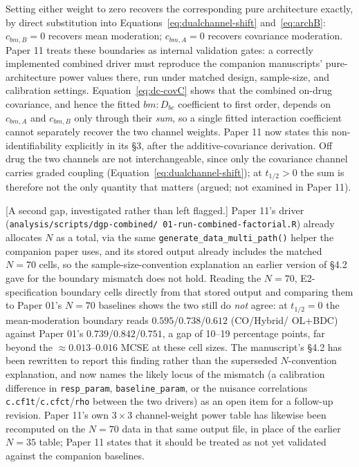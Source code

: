 \documentclass[11pt]{article}
\newcommand{\note}[1]{\textcolor{blue!60!black}{\small [#1]}}
\newcommand{\code}[1]{\texttt{#1}}
\begin{document}
Setting either weight to zero recovers the corresponding pure
architecture exactly, by direct substitution into
Equations~\eqref{eq:dualchannel-shift} and~\eqref{eq:archB}:
$c_{bm,B}=0$ recovers mean moderation; $c_{bm,A}=0$ recovers
covariance moderation. Paper 11 treats these boundaries as internal
validation gates: a correctly implemented combined driver must
reproduce the companion manuscripts' pure-architecture power values
there, run under matched design, sample-size, and calibration
settings. Equation~\eqref{eq:dc-covC} shows that the combined on-drug
covariance, and hence the fitted $bm{:}D_{bc}$ coefficient to first
order, depends on $c_{bm,A}$ and $c_{bm,B}$ only through their
\emph{sum}, so a single fitted interaction coefficient cannot
separately recover the two channel weights. Paper 11 now states this
non-identifiability explicitly in its \S3, after the additive-covariance
derivation. Off drug the two channels are not interchangeable, since
only the covariance channel carries graded coupling
(Equation~\eqref{eq:dualchannel-shift}); at $t_{1/2} > 0$ the sum is
therefore not the only quantity that matters (argued; not examined in
Paper 11).

\note{A second gap, investigated rather than left flagged.} Paper
11's driver (\code{analysis/scripts/dgp-combined/
01-run-combined-factorial.R}) already allocates $N$ as a total, via
the same \code{generate\_data\_multi\_path()} helper the companion
paper uses, and its stored output already includes the matched
$N=70$ cells, so the sample-size-convention explanation an earlier
version of \S4.2 gave for the boundary mismatch does not hold.
Reading the $N=70$, E2-specification boundary cells directly from
that stored output and comparing them to Paper 01's $N=70$ baselines
shows the two still do \emph{not} agree: at $t_{1/2}=0$ the
mean-moderation boundary reads $0.595$/$0.738$/$0.612$ (CO/Hybrid/
OL+BDC) against Paper 01's $0.739$/$0.842$/$0.751$, a gap of 10--19
percentage points, far beyond the $\approx0.013$--$0.016$ MCSE at
these cell sizes. The manuscript's \S4.2 has been rewritten to report
this finding rather than the superseded $N$-convention explanation,
and now names the likely locus of the mismatch (a calibration
difference in \texttt{resp\_param}, \texttt{baseline\_param}, or the
nuisance correlations \texttt{c.cf1t}/\texttt{c.cfct}/\texttt{rho}
between the two drivers) as an open item for a follow-up revision.
Paper 11's own $3\times3$ channel-weight power table has likewise been
recomputed on the $N=70$ data in that same output file, in place of
the earlier $N=35$ table; Paper 11 states that it should be treated as
not yet validated against the companion baselines.
\end{document}
